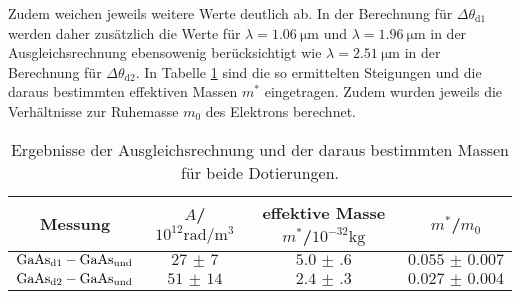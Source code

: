 Zudem weichen jeweils weitere Werte deutlich ab. In der Berechnung für $\Delta \theta_{\mathrm{d1}}$ werden daher zusätzlich die Werte für $\lambda=\SI{1.06}{\micro\meter}$ und $\lambda=\SI{1.96}{\micro\meter}$ in der Ausgleichsrechnung ebensowenig berücksichtigt wie $\lambda=\SI{2.51}{\micro\meter}$ in der Berechnung für
 $\Delta \theta_{\mathrm{d2}}$.
In Tabelle \ref{tab:steigung} sind die so ermittelten Steigungen und die daraus bestimmten effektiven Massen $m^{*}$ eingetragen. Zudem wurden jeweils die Verhältnisse zur Ruhemasse $m_{0}$ des Elektrons berechnet.
\begin{table}
  \centering
  \caption{Ergebnisse der Ausgleichsrechnung und der daraus bestimmten Massen für beide Dotierungen.}
  \label{tab:steigung}
  \begin{tabular}{cccc}
    \toprule
    Messung&$A$/$10^{12}\si{\radian\per\cubic\metre}$&effektive Masse  $m^{*}$/$10^{-32}\si{\kilo\gram}$&$m^{*}$/$m_{0}$\\
    \midrule
    $\ce{GaAs}_{\mathrm{d1}}-\ce{GaAs}_{\mathrm{und}}$&$\num{27(7)}$&$\num{5.0(6)}$&$\num{0.055(7)}$\\
    $\ce{GaAs}_{\mathrm{d2}}-\ce{GaAs}_{\mathrm{und}}$&$\num{51(14)}$&$\num{2.4(3)}$&$\num{0.027(4)}$\\
    \bottomrule
  \end{tabular}
\end{table}
